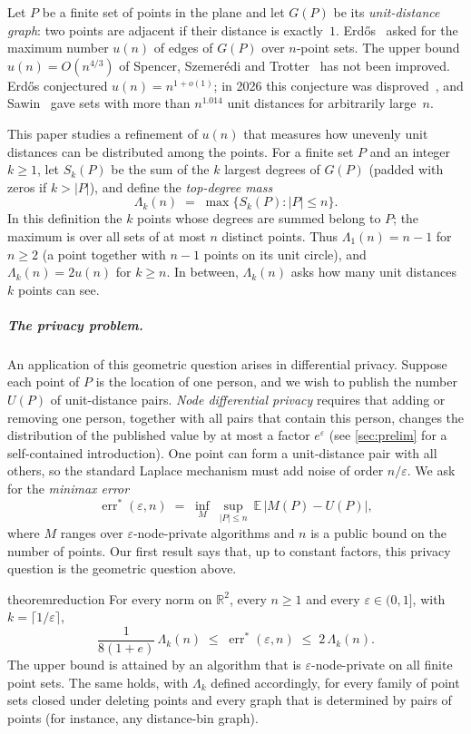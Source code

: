 \documentclass[anonymous,a4paper,USenglish,cleveref,autoref,thm-restate]{socg-lipics-v2021}
\newcommand{\R}{\mathbb{R}}
\newcommand{\eps}{\varepsilon}
\newcommand{\Lam}{\Lambda}
\newcommand{\errs}{\operatorname{err}^*}
\newcommand{\Ex}{\mathbb{E}}
\begin{document}
Let $P$ be a finite set of points in the plane and let $G(P)$ be its \emph{unit-distance graph}: two points are adjacent if their distance is exactly~$1$. Erd\H{o}s~\cite{Erdos46} asked for the maximum number $u(n)$ of edges of $G(P)$ over $n$-point sets. The upper bound $u(n)=O(n^{4/3})$ of Spencer, Szemer\'edi and Trotter~\cite{SpencerSzemerediTrotter84} has not been improved. Erd\H{o}s conjectured $u(n)=n^{1+o(1)}$; in 2026 this conjecture was disproved~\cite{Remarks2026}, and Sawin~\cite{Sawin2026} gave sets with more than $n^{1.014}$ unit distances for arbitrarily large~$n$.

This paper studies a refinement of $u(n)$ that measures how unevenly unit distances can be distributed among the points. For a finite set $P$ and an integer $k\ge1$, let $S_k(P)$ be the sum of the $k$ largest degrees of $G(P)$ (padded with zeros if $k>|P|$), and define the \emph{top-degree mass}
\[
  \Lam_k(n)\;=\;\max\{S_k(P): |P|\le n\}.
\]
In this definition the $k$ points whose degrees are summed belong to $P$; the maximum is over all sets of at most $n$ distinct points. Thus $\Lam_1(n)=n-1$ for $n\ge2$ (a point together with $n-1$ points on its unit circle), and $\Lam_k(n)=2u(n)$ for $k\ge n$. In between, $\Lam_k(n)$ asks how many unit distances $k$ points can see.

\subparagraph*{The privacy problem.}
An application of this geometric question arises in differential privacy. Suppose each point of $P$ is the location of one person, and we wish to publish the number $U(P)$ of unit-distance pairs. \emph{Node differential privacy} requires that adding or removing one person, together with all pairs that contain this person, changes the distribution of the published value by at most a factor $e^{\eps}$ (see \cref{sec:prelim} for a self-contained introduction). One point can form a unit-distance pair with all others, so the standard Laplace mechanism must add noise of order $n/\eps$. We ask for the \emph{minimax error}
\[
  \errs(\eps,n)\;=\;\inf_{M}\ \sup_{|P|\le n}\ \Ex\,\bigl|M(P)-U(P)\bigr|,
\]
where $M$ ranges over $\eps$-node-private algorithms and $n$ is a public bound on the number of points. Our first result says that, up to constant factors, this privacy question is the geometric question above.

\begin{restatable}[Reduction]{theorem}{reduction}
\label{thm:reduction}
For every norm on $\R^2$, every $n\ge1$ and every $\eps\in(0,1]$, with $k=\lceil 1/\eps\rceil$,
\[
  \frac{1}{8(1+e)}\,\Lam_k(n)\;\le\;\errs(\eps,n)\;\le\;2\,\Lam_k(n).
\]
The upper bound is attained by an algorithm that is $\eps$-node-private on all finite point sets. The same holds, with $\Lam_k$ defined accordingly, for every family of point sets closed under deleting points and every graph that is determined by pairs of points (for instance, any distance-bin graph).
\end{restatable}
\end{document}
